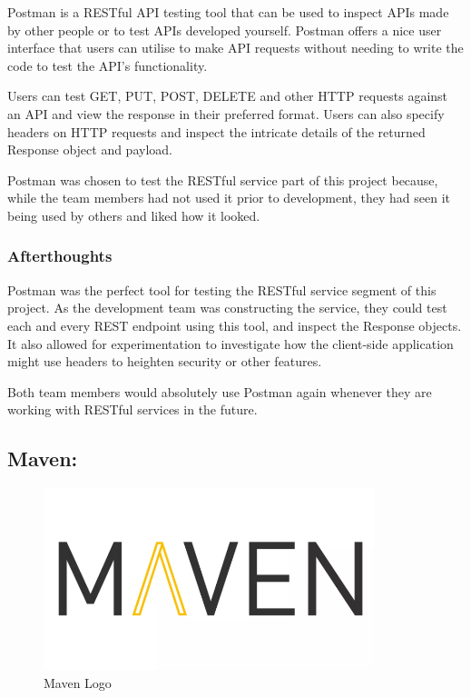 Postman is a RESTful API testing tool that can be used to inspect APIs made by other people or to test APIs developed yourself. Postman offers a nice user interface that users can utilise to make API requests without needing to write the code to test the API's functionality. 

Users can test GET, PUT, POST, DELETE and other HTTP requests against an API and view the response in their preferred format. Users can also specify headers on HTTP requests and inspect the intricate details of the returned Response object and payload.

\bigskip

Postman was chosen to test the RESTful service part of this project because, while the team members had not used it prior to development, they had seen it being used by others and liked how it looked.

\subsubsection{Afterthoughts}
Postman was the perfect tool for testing the RESTful service segment of this project. As the development team was constructing the service, they could test each and every REST endpoint using this tool, and inspect the Response objects. It also allowed for experimentation to investigate how the client-side application might use headers to heighten security or other features. 

Both team members would absolutely use Postman again whenever they are working with RESTful services in the future.


\subsection{Maven:}
\label{sec:TechnologyReviewMaven}

\begin{figure}[H]
    \centering
    \includegraphics[width=\textwidth, height=150pt]{img/MavenLogo.PNG}
    \caption{Maven Logo}
    \label{fig:my_label}
\end{figure}

